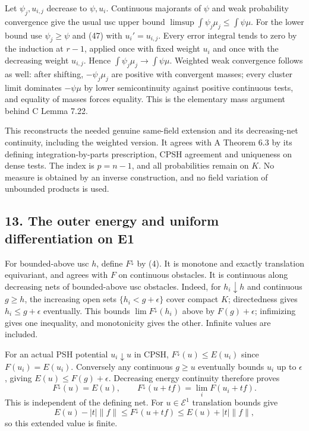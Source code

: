 \documentclass[
  10pt,
]{article}
\begin{document}
Let \(\psi_j,u_{i,j}\) decrease to \(\psi,u_i\). Continuous majorants of
\(\psi\) and weak probability convergence give the usual usc upper bound
\(\limsup\int\psi_j\mu_j\leq\int\psi\mu\). For the lower bound use
\(\psi_j\geq\psi\) and (47) with \(u_i'=u_{i,j}\). Every error integral
tends to zero by the induction at \(r-1\), applied once with fixed
weight \(u_i\) and once with the decreasing weight \(u_{i,j}\). Hence
\(\int\psi_j\mu_j\to\int\psi\mu\). Weighted weak convergence follows as
well: after shifting, \(-\psi_j\mu_j\) are positive with convergent
masses; every cluster limit dominates \(-\psi\mu\) by lower
semicontinuity against positive continuous tests, and equality of masses
forces equality. This is the elementary mass argument behind C Lemma
7.22.

This reconstructs the needed genuine same-field extension and its
decreasing-net continuity, including the weighted version. It agrees
with A Theorem 6.3 by its defining integration-by-parts prescription,
CPSH agreement and uniqueness on dense tests. The index is \(p=n-1\),
and all probabilities remain on \(K\). No measure is obtained by an
inverse construction, and no field variation of unbounded products is
used.

\subsection{13. The outer energy and uniform differentiation on
E1}\label{the-outer-energy-and-uniform-differentiation-on-e1}

For bounded-above usc \(h\), define \(F^\downarrow\) by (4). It is
monotone and exactly translation equivariant, and agrees with \(F\) on
continuous obstacles. It is continuous along decreasing nets of
bounded-above usc obstacles. Indeed, for \(h_i\downarrow h\) and
continuous \(g\geq h\), the increasing open sets \(\{h_i<g+\epsilon\}\)
cover compact \(K\); directedness gives \(h_i\leq g+\epsilon\)
eventually. This bounds \(\lim F^\downarrow(h_i)\) above by
\(F(g)+\epsilon\); infimizing gives one inequality, and monotonicity
gives the other. Infinite values are included.

For an actual PSH potential \(u_i\downarrow u\) in CPSH,
\(F^\downarrow(u)\leq E(u_i)\) since \(F(u_i)=E(u_i)\). Conversely any
continuous \(g\geq u\) eventually bounds \(u_i\) up to \(\epsilon\),
giving \(E(u)\leq F(g)+\epsilon\). Decreasing energy continuity
therefore proves
\[ F^\downarrow(u)=E(u),\qquad F^\downarrow(u+tf)=\lim_iF(u_i+tf).                               \tag{48}\]
This is independent of the defining net. For \(u\in\mathcal E^1\)
translation bounds give
\[ E(u)-|t|\|f\|\leq F^\downarrow(u+tf)\leq E(u)+|t|\|f\|, \] so this
extended value is finite.
\end{document}
